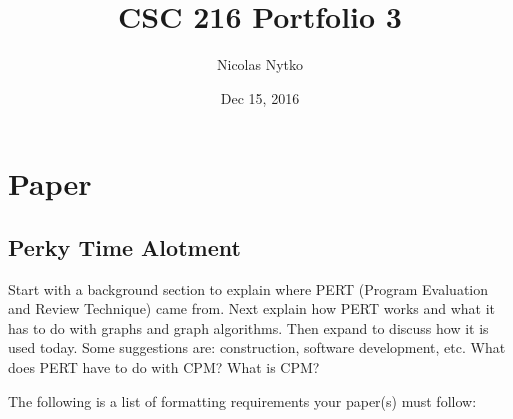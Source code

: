 \documentclass{template}
\title{CSC 216 Portfolio 3}
\author{Nicolas Nytko}
\date{Dec 15, 2016}
\begin{document}
\maketitle
\newpage
\tableofcontents
\newpage
\section{Paper}
\subsection{Perky Time Alotment}
Start with a background section to explain where PERT (Program Evaluation and Review Technique) came from. Next explain how PERT works and what it has to do with graphs and graph algorithms. Then expand to discuss how it is used today. Some suggestions are: construction, software development, etc. What does PERT have to do with CPM? What is CPM?

The following is a list of formatting requirements your paper(s) must follow:
 
\end{document}
